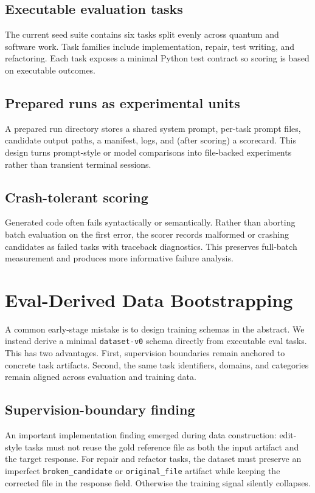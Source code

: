\documentclass[11pt]{article}
\begin{document}
\subsection{Executable evaluation tasks}
The current seed suite contains six tasks split evenly across quantum and software work. Task families include implementation, repair, test writing, and refactoring. Each task exposes a minimal Python test contract so scoring is based on executable outcomes.

\subsection{Prepared runs as experimental units}
A prepared run directory stores a shared system prompt, per-task prompt files, candidate output paths, a manifest, logs, and (after scoring) a scorecard. This design turns prompt-style or model comparisons into file-backed experiments rather than transient terminal sessions.

\subsection{Crash-tolerant scoring}
Generated code often fails syntactically or semantically. Rather than aborting batch evaluation on the first error, the scorer records malformed or crashing candidates as failed tasks with traceback diagnostics. This preserves full-batch measurement and produces more informative failure analysis.

\section{Eval-Derived Data Bootstrapping}
A common early-stage mistake is to design training schemas in the abstract. We instead derive a minimal \texttt{dataset-v0} schema directly from executable eval tasks. This has two advantages. First, supervision boundaries remain anchored to concrete task artifacts. Second, the same task identifiers, domains, and categories remain aligned across evaluation and training data.

\subsection{Supervision-boundary finding}
An important implementation finding emerged during data construction: edit-style tasks must not reuse the gold reference file as both the input artifact and the target response. For repair and refactor tasks, the dataset must preserve an imperfect \texttt{broken\_candidate} or \texttt{original\_file} artifact while keeping the corrected file in the response field. Otherwise the training signal silently collapses.
\end{document}
